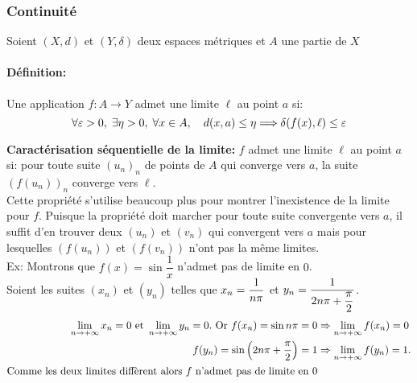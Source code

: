 \documentclass[12pt,a4paper]{article}
\begin{document}
	\subsubsection{Continuité}
	Soient $ \left(X,d\right) $ et $\left(Y,\delta\right)$ deux espaces métriques et $A$ une partie de $X$
	\paragraph{Définition:} Une application $f : A \longrightarrow Y $ admet une limite $\ell$ au point $a$ si:
	\[ \forall \varepsilon >0, \; \exists \eta >0, \; \forall x \in A , \quad d(x,a)\leq\eta \Longrightarrow \delta(f(x),\ell)\leq\varepsilon  \]
	
	\textbf{Caractérisation séquentielle de la limite: } $f$ admet une limite $\ell$ au point $a$ si: 
	pour toute suite $(u_n)_n$ de points de $A$ qui converge vers $a$, la suite $(f(u_n))_n$ converge vers $\ell$.\\
	Cette propriété s'utilise beaucoup plus pour montrer l'inexistence de la limite pour $f$. Puisque la propriété doit marcher pour toute suite convergente vers $a$,
	il suffit d'en trouver deux $(u_n)$ et $(v_n)$ qui convergent vers $a$ mais pour lesquelles $(f(u_n))$ et $(f(v_n))$ n'ont pas la même limites.\\
	Ex: Montrons que $f(x)=\sin \dfrac{1}{x}$ n'admet pas de limite en $0$.\\
	Soient les suites $(x_n)$ et $(y_n)$ telles que $\displaystyle x_n=\dfrac{1}{n\pi}$ et $y_n=\dfrac{1}{2n\pi + \displaystyle\frac{\pi}{2}}$.\\
	\begin{eqnarray*}
		\displaystyle \lim\limits_{n\to +\infty} x_n=0 \text{ et } \displaystyle \lim\limits_{n\to +\infty} y_n=0. \text{ Or }f(x_n)=\sin n\pi =0 &\Rightarrow  \lim\limits_{n\to +\infty} f(x_n)=0\\
		f(y_n)=\sin\left(2n\pi +\dfrac{\pi}{2}\right)=1 &\Rightarrow  \lim\limits_{n\to +\infty} f(y_n)=1.\\
		\text{Comme les deux limites diffèrent alors $f$ n'admet pas de limite en 0}
	\end{eqnarray*}
	
\end{document}
